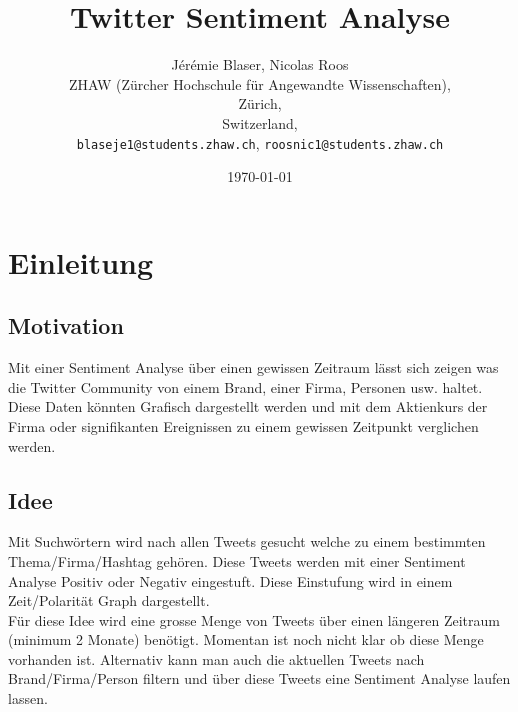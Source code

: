 \documentclass[12pt, oneside]{report}   	%
\title{Twitter Sentiment Analyse}
\author{Jérémie Blaser, Nicolas Roos\\
	ZHAW (Zürcher Hochschule für Angewandte Wissenschaften),\\
	Zürich,\\
	Switzerland,\\
	\texttt{blaseje1@students.zhaw.ch},
	\texttt{roosnic1@students.zhaw.ch}}
\date{\today}							%
\begin{document}
\newcommand{\qem}[1]{\emph{"<#1">}} %

\maketitle




\tableofcontents



\chapter{Einleitung}
\section{Motivation}
Mit einer Sentiment Analyse über einen gewissen Zeitraum lässt sich zeigen was die Twitter Community von einem Brand, einer Firma, Personen usw. haltet. Diese Daten könnten Grafisch dargestellt werden und mit dem Aktienkurs der Firma oder signifikanten Ereignissen zu einem gewissen Zeitpunkt verglichen werden. 
\section{Idee}
Mit Suchwörtern wird nach allen Tweets gesucht welche zu einem bestimmten Thema/Firma/Hashtag gehören. Diese Tweets werden mit einer Sentiment Analyse Positiv oder Negativ eingestuft. Diese Einstufung wird in einem Zeit/Polarität Graph dargestellt. \\
Für diese Idee wird eine grosse Menge von Tweets über einen längeren Zeitraum (minimum 2 Monate) benötigt. Momentan ist noch nicht klar ob diese Menge vorhanden ist. Alternativ kann man auch die aktuellen Tweets nach Brand/Firma/Person filtern und über diese Tweets eine Sentiment Analyse laufen lassen.
\end{document}
